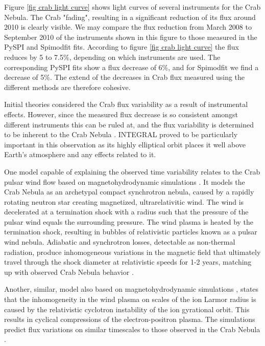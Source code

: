 \documentclass{report}
\begin{document}
Figure \ref{fig crab light curve} shows light curves of several instruments for the Crab Nebula. The Crab "fading", resulting in a significant reduction of its flux around 2010 is clearly visible. We may compare the flux reduction from March 2008 to September 2010 of the instruments shown in this figure to those measured in the PySPI and Spimodfit fits. According to figure \ref{fig crab light curve} the flux reduces by 5 to 7.5\%, depending on which instruments are used. The corresponding PySPI fits show a flux decrease of 6\%, and for Spimodfit we find a decrease of 5\%. The extend of the decreases in Crab flux measured using the different methods are therefore cohesive.

Initial theories considered the Crab flux variability as a result of instrumental effects. However, since the measured flux decrease is so consistent amongst different instruments this can be ruled at, and the flux variability is determined to be inherent to the Crab Nebula \cite{Wilson_Hodge_2011}. INTEGRAL proved to be particularly important in this observation as its highly elliptical orbit places it well above Earth's atmosphere and any effects related to it.

One model capable of explaining the observed time variability relates to the Crab pulsar wind flow based on magnetohydrodynamic simulations \cite{10.1111/j.1365-2966.2009.15550.x}. It models the Crab Nebula as an archetypal compact synchrotron nebula, caused by a rapidly rotating neutron star creating magnetized, ultrarelativitic wind. The wind is decelerated at a termination shock with a radius such that the pressure of the pulsar wind equals the surrounding pressure. The wind plasma is heated by the termination shock, resulting in bubbles of relativistic particles known as a pulsar wind nebula. Adiabatic and synchrotron losses, detectable as non-thermal radiation, produce inhomogeneous variations in the  magnetic field that ultimately travel through the shock diameter at relativistic speeds for 1-2 years, matching up with observed Crab Nebula behavior \cite{Wilson_Hodge_2011}.

Another, similar, model also based on magnetohydrodynamic simulations \cite{Spitkovsky_2004}, states that the inhomogeneity in the wind plasma on scales of the ion Larmor radius is caused by the relativistic cyclotron instability of the ion gyrational orbit. This results in cyclical compressions of the electron-positron plasma. The simulations predict flux variations on similar timescales to those observed in the Crab Nebula \cite{Wilson_Hodge_2011}.
\end{document}
